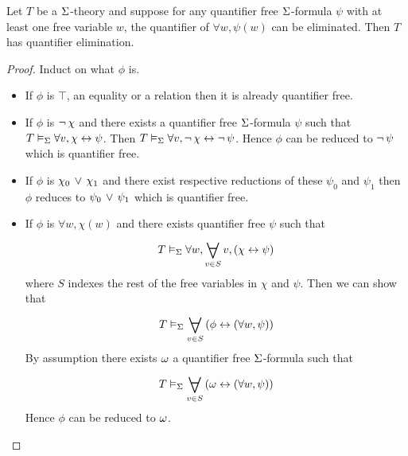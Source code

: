 \begin{lem}
    Let $T$ be a $\Sigma$-theory and suppose for any quantifier free $\Sigma$-formula
    $\psi$ with at least one free variable $w$, the quantifier of 
    $\forall w, \psi (w)$ can be eliminated.
    Then $T$ has quantifier elimination.
\end{lem}
\begin{proof}
    Induct on what $\phi$ is.
    \begin{itemize}
        \item If $\phi$ is $\top$, an equality or a relation then it is already 
            quantifier free.
        \item If $\phi$ is $\neg\, \chi$ and there exists a quantifier free 
            $\Sigma$-formula $\psi$ such that 
            $T \vDash_{\Sigma} \forall v, \chi \leftrightarrow \psi$.
            Then $T \vDash_{\Sigma} \forall v, \neg\, \chi \leftrightarrow \neg\, \psi$.
            Hence $\phi$ can be reduced to $\neg\, \psi$ which is quantifier free.
        \item If $\phi$ is $\chi_0 \, \lor \, \chi_1$ and there exist respective 
            reductions of these $\psi_0$ and $\psi_1$ then
            $\phi$ reduces to $\psi_0 \, \lor \, \psi_1$ which is quantifier free.
        \item If $\phi$ is $\forall w, \chi(w)$ and there exists quantifier free
            $\psi$ such that 
            \[T \model{\Si} \forall w, \bigforall{v \in S}{} v, 
                \brkt{\chi \IFF \psi}\]
            where $S$ indexes the rest of the free variables in 
            $\chi$ and $\psi$.
            Then we can show that 
            \[
                T \model{\Si} \bigforall{v \in S}{}
                \brkt{\phi \IFF (\forall w, \psi)}
            \]
            By assumption there exists $\omega$ a quantifier free $\Sigma$-formula
            such that 
            \[
                T \model{\Si} \bigforall{v \in S}{}
                \brkt{\om \IFF (\forall w, \psi)}
            \]
            Hence $\phi$ can be reduced to $\omega$.
    \end{itemize}
\end{proof}

